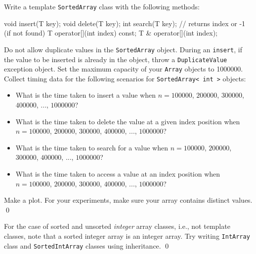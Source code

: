 \begin{ex}
Write a template \verb!SortedArray! class with the following 
methods:
\begin{console}[fontsize=\footnotesize]
void insert(T key);
void delete(T key);
int  search(T key); // returns index or -1 (if not found)
T    operator[](int index) const;
T &  operator[](int index);
\end{console}
Do not allow duplicate values in the \verb!SortedArray! object.
During an \verb!insert!, if the value to be inserted is already in the 
object, throw a \verb!DuplicateValue! exception object.
Set the maximum capacity of your \verb!Array! objects to 1000000.
Collect timing data for the following scenarios for 
\verb!SortedArray< int >! objects:
\begin{itemize}
\item What is the time taken to insert a value when
$n = 100000$, $200000$, $300000$, $400000$, ..., $1000000$?
\item What is the time taken to delete the value at a given index position
when
$n = 100000$, $200000$, $300000$, $400000$, ..., $1000000$?
\item What is the time taken to search for a value when
$n = 100000$, $200000$, $300000$, $400000$, ..., $1000000$?
\item What is the time taken to access a value at an index position when
$n = 100000$, $200000$, $300000$, $400000$, ..., $1000000$?
\end{itemize}
Make a plot.
For your experiments, make sure your array contains distinct values.
\qed
\end{ex}

\begin{ex}
For the case of sorted and unsorted \textit{integer} array classes, 
i.e., not template classes, note that
a sorted integer array is an integer array.
Try writing \verb!IntArray! class and \verb!SortedIntArray! classes
using inheritance.
\qed
\end{ex}
